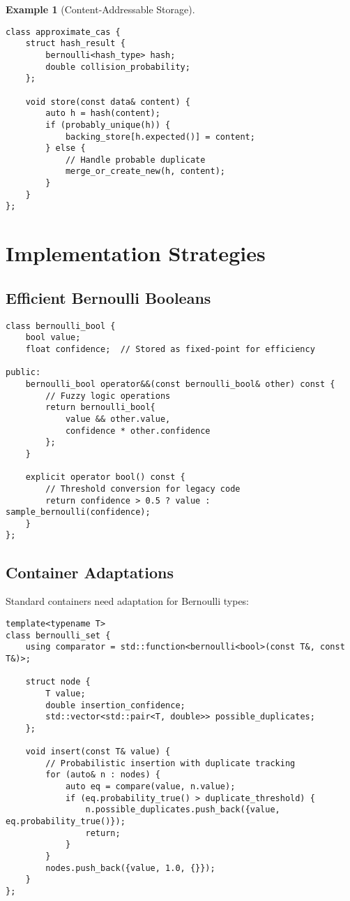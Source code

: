 \documentclass[11pt,final,hidelinks]{article}
\newtheorem{example}[theorem]{Example}
\begin{document}
\begin{example}[Content-Addressable Storage]
\begin{verbatim}
class approximate_cas {
    struct hash_result {
        bernoulli<hash_type> hash;
        double collision_probability;
    };
    
    void store(const data& content) {
        auto h = hash(content);
        if (probably_unique(h)) {
            backing_store[h.expected()] = content;
        } else {
            // Handle probable duplicate
            merge_or_create_new(h, content);
        }
    }
};
\end{verbatim}
\end{example}

\section{Implementation Strategies}

\subsection{Efficient Bernoulli Booleans}

\begin{verbatim}
class bernoulli_bool {
    bool value;
    float confidence;  // Stored as fixed-point for efficiency
    
public:
    bernoulli_bool operator&&(const bernoulli_bool& other) const {
        // Fuzzy logic operations
        return bernoulli_bool{
            value && other.value,
            confidence * other.confidence
        };
    }
    
    explicit operator bool() const {
        // Threshold conversion for legacy code
        return confidence > 0.5 ? value : sample_bernoulli(confidence);
    }
};
\end{verbatim}

\subsection{Container Adaptations}

Standard containers need adaptation for Bernoulli types:

\begin{verbatim}
template<typename T>
class bernoulli_set {
    using comparator = std::function<bernoulli<bool>(const T&, const T&)>;
    
    struct node {
        T value;
        double insertion_confidence;
        std::vector<std::pair<T, double>> possible_duplicates;
    };
    
    void insert(const T& value) {
        // Probabilistic insertion with duplicate tracking
        for (auto& n : nodes) {
            auto eq = compare(value, n.value);
            if (eq.probability_true() > duplicate_threshold) {
                n.possible_duplicates.push_back({value, eq.probability_true()});
                return;
            }
        }
        nodes.push_back({value, 1.0, {}});
    }
};
\end{verbatim}
\end{document}
